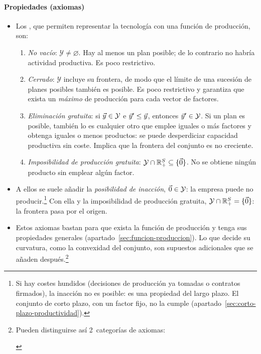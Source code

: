 \documentclass[11pt]{article}
\begin{document}
\paragraph{Propiedades (axiomas)}

\begin{itemize}
\item Los , que permiten representar la tecnología con una función de producción, son\nocite{MasColellWhinstonGreen1995}:
  \begin{enumerate}
  \item \emph{No vacío}: $\mathcal{Y}\neq\varnothing$. Hay al menos un plan posible; de lo contrario no habría actividad productiva. Es poco restrictivo.
  \item \emph{Cerrado}: $\mathcal{Y}$ incluye su frontera, de modo que el límite de una sucesión de planes posibles también es posible. Es poco restrictivo y garantiza que exista un \emph{máximo} de producción para cada vector de factores.
  \item \emph{Eliminación gratuita}: si $\vec{y}\in\mathcal{Y}$ e $\vec{y}'\leq\vec{y}$, entonces $\vec{y}'\in\mathcal{Y}$. Si un plan es posible, también lo es cualquier otro que emplee iguales o más factores y obtenga iguales o menos productos: se puede desperdiciar capacidad productiva sin coste. Implica que la frontera del conjunto es no creciente.
  \item \emph{Imposibilidad de producción gratuita}: $\mathcal{Y}\cap\mathbb{R}^S_+\subseteq\{\vec{0}\}$. No se obtiene ningún producto sin emplear algún factor.
  \end{enumerate}
\item A ellos se suele añadir la \emph{posibilidad de inacción}, $\vec{0}\in\mathcal{Y}$: la empresa puede no producir.\footnote{Si hay costes hundidos (decisiones de producción ya tomadas o contratos firmados), la inacción no es posible: es una propiedad del largo plazo. El conjunto de corto plazo, con un factor fijo, no la cumple (apartado~\ref{sec:corto-plazo-productividad}).} Con ella y la imposibilidad de producción gratuita, $\mathcal{Y}\cap\mathbb{R}^S_+=\{\vec{0}\}$: la frontera pasa por el origen.
\item Estos axiomas bastan para que exista la función de producción y tenga sus propiedades generales (apartado~\ref{sec:funcion-produccion}). Lo que decide su curvatura, como la convexidad del conjunto, son supuestos adicionales que se añaden después.\footnote{Pueden distinguirse así 2~categorías de axiomas:
\begin{itemize}

\end{itemize}}
\end{itemize}
\end{document}
